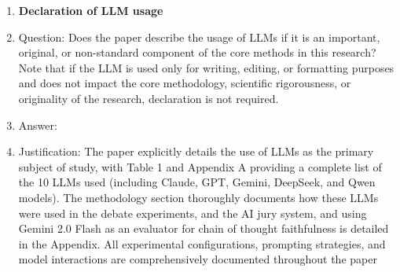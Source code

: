 \documentclass{article}
\begin{document}
\begin{enumerate}
\item {\bf Declaration of LLM usage}
    \item[] Question: Does the paper describe the usage of LLMs if it is an important, original, or non-standard component of the core methods in this research? Note that if the LLM is used only for writing, editing, or formatting purposes and does not impact the core methodology, scientific rigorousness, or originality of the research, declaration is not required.
    \item[] Answer: \answerYes{} %
    \item[] Justification: The paper explicitly details the use of LLMs as the primary subject of study, with Table 1 and Appendix A providing a complete list of the 10 LLMs used (including Claude, GPT, Gemini, DeepSeek, and Qwen models). The methodology section thoroughly documents how these LLMs were used in the debate experiments, and the AI jury system, and using Gemini 2.0 Flash as an evaluator for chain of thought faithfulness is detailed in the Appendix. All experimental configurations, prompting strategies, and model interactions are comprehensively documented throughout the paper

\end{enumerate}
\end{document}
